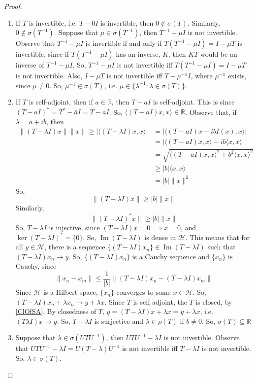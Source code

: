 \documentclass{report}
\newcommand{\im}{\operatorname{Im}}
\begin{document}
\begin{proof}
\begin{enumerate}
    \item If $T$ is invertible, i.e. $T-0I$ is invertible, then $0\notin\sigma(T)$. Similarly, $0\notin\sigma(T^{-1})$. Suppose that $\mu\in\sigma(T^{-1})$, then $T^{-1}-\mu I$ is not invertible. Observe that $T^{-1}-\mu I$ is invertible if and only if $T(T^{-1}-\mu I)=I-\mu T$ is invertible, since if $T(T^{-1}-\mu I)$ has an inverse, $K$, then $KT$ would be an inverse of $T^{-1}-\mu I$. So, $T^{-1}-\mu I$ is not invertible iff $T(T^{-1}-\mu I)=I-\mu T$ is not invertible. Also, $I-\mu T$ is not invertible iff $T-\mu^{-1}I$, where $\mu^{-1}$ exists, since $\mu\not=0$. So, $\mu^{-1}\in\sigma(T)$, i.e. $\mu\in\{\lambda^{-1}: \lambda\in\sigma(T)\}$.
    \item If $T$ is self-adjoint, then if $a\in\mathbb{R}$, then $T-aI$ is self-adjoint. This is since $(T-aI)^{*}=T^{*}-\bar{a}I=T-aI$. So, $\langle(T-aI)x,x\rangle\in\mathbb{R}$. Observe that, if $\lambda = a+ib$, then
      $$
      \begin{aligned}
        \|(T-\lambda I)x\|\|x\|\geq|\langle(T-\lambda I)x,x\rangle|&=|\langle(T-aI)x-ibI(x),x\rangle|\\
                                                                   &=|\langle(T-aI)x,x\rangle-ib\langle x,x\rangle|\\
                                                                   &=\sqrt{\langle(T-aI)x,x\rangle^{2}+b^{2}\langle x,x\rangle^{2}}\\
                                                                   &\geq|b|\langle x,x\rangle\\
                                                                   &=|b|\|x\|^{2}
      \end{aligned}
      $$
      So,
      $$
      \|(T-\lambda I)x\|\geq|b|\|x\|
      $$
      Similarly,
      $$
      \|(T-\lambda I)^{*}x\|\geq|b|\|x\|
      $$
      So, $T-\lambda I$ is injective, since $(T-\lambda I)x=0\implies x=0$, and $\ker(T-\lambda I)^{*}=\{0\}$. So, $\im(T-\lambda I)$ is dense in $\mathcal{H}$. This means that for all $y\in\mathcal{H}$, there is a sequence $\{(T-\lambda I)x_{n}\}\in\im(T-\lambda I)$ such that $(T-\lambda I)x_{n}\to y$. So, $\{(T-\lambda I)x_{n}\}$ is a Cauchy sequence and $\{x_{n}\}$ is Cauchy, since
      $$
      \|x_{n}-x_{m}\|\leq\frac{1}{|b|}\|(T-\lambda I)x_{n}-(T-\lambda I)x_{m}\|
      $$
      Since $\mathcal{H}$ is a Hilbert space, $\{x_{n}\}$ converges to some $x\in\mathcal{H}$. So, $(T-\lambda I)x_{n}+\lambda x_{n}\to y+\lambda x$. Since $T$ is self adjoint, the $T$ is closed, by \ref{ClOfSA}. By closedness of $T$, $y=(T-\lambda I)x+\lambda x=y+\lambda x$, i.e. $(T\lambda I)x\to y$. So, $T-\lambda I$ is surjective and $\lambda\in\rho(T)$ if $b\not=0$. So, $\sigma(T)\subseteq\mathbb{R}$
    \item Suppose that $\lambda\in\sigma(UTU^{-1})$, then $UTU^{-1}-\lambda I$ is not invertible. Observe that $UTU^{-1}-\lambda I=U(T-\lambda)U^{-1}$ is not invertible iff $T-\lambda I$ is not invertible. So, $\lambda\in\sigma(T)$.
  \end{enumerate}
\end{proof}
\end{document}
